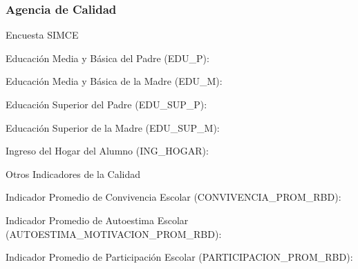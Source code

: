 \subsubsection{Agencia de Calidad}
\begin{longdescription}

  \item[Encuesta SIMCE] \hfill \\
     \begin{longdescription}
        \item[Educación Media y Básica del Padre](EDU\_P):
        \item[Educación Media y Básica de la Madre](EDU\_M):
        \item[Educación Superior del Padre](EDU\_SUP\_P):
        \item[Educación Superior de la Madre](EDU\_SUP\_M):
        \item[Ingreso del Hogar del Alumno](ING\_HOGAR):
     \end{longdescription}
  \item[Otros Indicadores de la Calidad] \hfill \\
       \begin{longdescription}
        \item[Indicador Promedio de Convivencia Escolar](CONVIVENCIA\_PROM\_RBD):
        \item[Indicador Promedio de Autoestima Escolar](AUTOESTIMA\_MOTIVACION\_PROM\_RBD):
        \item[Indicador Promedio de Participación Escolar](PARTICIPACION\_PROM\_RBD):
       \end{longdescription}
\end{longdescription}